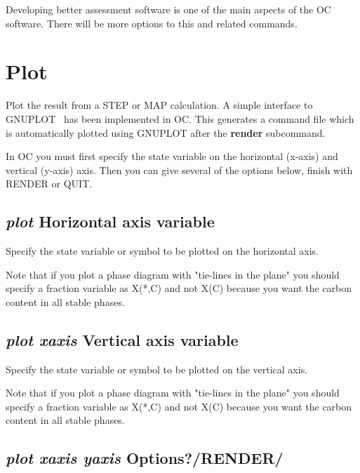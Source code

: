 \documentclass[11pt]{article}
\begin{document}
Developing better assessment software is one of the main aspects of
the OC software.  There will be more options to this and related
commands.

\hypertarget{Plot command}{}
\section{Plot }\label{sc:plot}

Plot the result from a STEP or MAP calculation.  A simple interface to
GNUPLOT~\cite{gnuplot} has been implemented in OC.  This generates a
command file which is automatically plotted using GNUPLOT after the
{\bf render} subcommand.

In OC you must first specify the state variable on the horizontal
(x-axis) and vertical (y-axis) axis.  Then you can give several of the
options below, finish with RENDER or QUIT.

\hypertarget{Horizontal axis variable}{}
\subsection{{\em plot} Horizontal axis variable}

Specify the state variable or symbol to be plotted on the horizontal axis.

Note that if you plot a phase diagram with "tie-lines in the plane"
you should specify a fraction variable as X(*,C) and not X(C)
because you want the carbon content in all stable phases.

\hypertarget{Vertical axis variable}{}
\subsection{{\em plot xaxis} Vertical axis variable}

Specify the state variable or symbol to be plotted on the vertical axis.

Note that if you plot a phase diagram with "tie-lines in the plane"
you should specify a fraction variable as X(*,C) and not X(C) because
you want the carbon content in all stable phases.

\hypertarget{Plot}{}
\hypertarget{Plot options}{}
\subsection{{\em plot xaxis yaxis} Options?/RENDER/}
\end{document}
